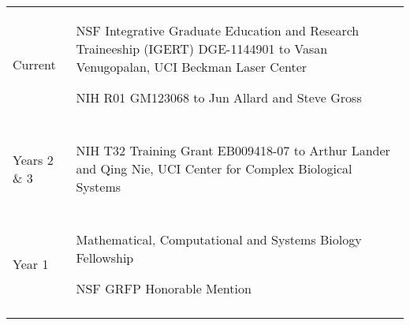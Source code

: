 \documentclass[letterpaper,10pt]{article} %
\makeatletter
\newcommand\cellwidth{\TX@col@width}
\makeatother
\begin{document}
\begin{tabularx}{\textwidth}{>{\raggedleft}p{} | X}

Current &
\begin{minipage}{\cellwidth}
\begin{description}[itemsep=.25ex,labelsep=0em]
\item NSF Integrative Graduate Education and Research Traineeship (IGERT) DGE-1144901 to Vasan Venugopalan, UCI Beckman Laser Center
\item NIH R01 GM123068 to Jun Allard and Steve Gross
\end{description}
\end{minipage} \\

\multicolumn{2}{c}{} \\

Years 2 \& 3 &
\begin{minipage}{\cellwidth}
\begin{description}[itemsep=.25ex,labelsep=0em]
\item NIH T32 Training Grant EB009418-07 to Arthur Lander and Qing Nie, UCI Center for Complex Biological Systems
\end{description}
\end{minipage} \\

\multicolumn{2}{c}{} \\

Year 1 &
\begin{minipage}{\cellwidth}
\begin{description}[itemsep=.25ex,labelsep=0em]
\item Mathematical, Computational and Systems Biology Fellowship
\item NSF GRFP Honorable Mention
\end{description}
\end{minipage} \\

\multicolumn{2}{c}{} \\


 

\end{tabularx}
\end{document}
